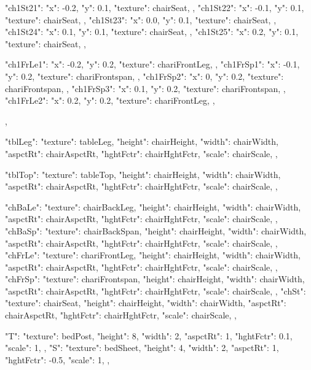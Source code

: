 {{{      "ch1St21":{ "x": -0.2,  "y": 0.1, "texture": chairSeat, },
      "ch1St22":{ "x": -0.1,  "y": 0.1, "texture": chairSeat, },
      "ch1St23":{ "x": 0.0,   "y": 0.1, "texture": chairSeat, },
      "ch1St24":{ "x": 0.1,   "y": 0.1, "texture": chairSeat, },
      "ch1St25":{ "x": 0.2,   "y": 0.1, "texture": chairSeat, },

      "ch1FrLe1":{ "x": -0.2, "y": 0.2, "texture": chariFrontLeg, },
      "ch1FrSp1":{ "x": -0.1, "y": 0.2, "texture": chariFrontspan, },
      "ch1FrSp2":{ "x": 0,    "y": 0.2, "texture": chariFrontspan, },
      "ch1FrSp3":{ "x": 0.1,  "y": 0.2, "texture": chariFrontspan, },
      "ch1FrLe2":{ "x": 0.2,  "y": 0.2, "texture": chariFrontLeg, },
    }
  },

  "tblLeg": {
    "texture": tableLeg,
    "height": chairHeight,
    "width": chairWidth,
    "aspctRt": chairAspctRt,
    "hghtFctr": chairHghtFctr,
    "scale": chairScale,
  },  

  "tblTop": {
    "texture": tableTop,
    "height": chairHeight,
    "width": chairWidth,
    "aspctRt": chairAspctRt,
    "hghtFctr": chairHghtFctr,
    "scale": chairScale,
  },  

  "chBaLe": {
    "texture": chairBackLeg,
    "height": chairHeight,
    "width": chairWidth,
    "aspctRt": chairAspctRt,
    "hghtFctr": chairHghtFctr,
    "scale": chairScale,
  },  
  "chBaSp": {
    "texture": chairBackSpan,
    "height": chairHeight,
    "width": chairWidth,
    "aspctRt": chairAspctRt,
    "hghtFctr": chairHghtFctr,
    "scale": chairScale,
  },
  "chFrLe": {
    "texture": chariFrontLeg,
    "height": chairHeight,
    "width": chairWidth,
    "aspctRt": chairAspctRt,
    "hghtFctr": chairHghtFctr,
    "scale": chairScale,
  },
  "chFrSp": {
    "texture": chariFrontspan,
    "height": chairHeight,
    "width": chairWidth,
    "aspctRt": chairAspctRt,
    "hghtFctr": chairHghtFctr,
    "scale": chairScale,
  },
  "chSt": {
    "texture": chairSeat,
    "height": chairHeight,
    "width": chairWidth,
    "aspctRt": chairAspctRt,
    "hghtFctr": chairHghtFctr,
    "scale": chairScale,
  },

  "T": {
    "texture": bedPost,
    "height": 8,
    "width": 2,
    "aspctRt": 1,
    "hghtFctr": 0.1,
    "scale": 1,
  },  
  "S": {
    "texture": bedSheet,
    "height": 4,
    "width": 2,
    "aspctRt": 1,
    "hghtFctr": -0.5,
    "scale": 1,
  },

}
